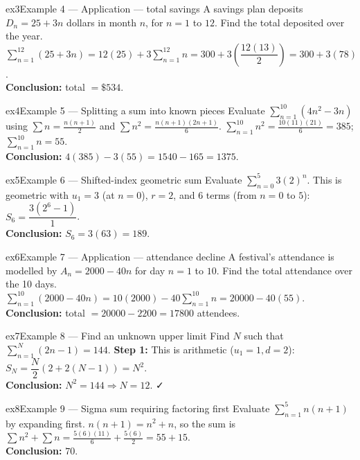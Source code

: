 \documentclass[11pt]{article}
\begin{document}
\begin{example}{ex3}{Example 4 --- Application --- total savings}
A savings plan deposits $D_n=25+3n$ dollars in month $n$, for $n=1$ to $12$. Find the total deposited over the year.\soln
$\displaystyle\sum_{n=1}^{12}(25+3n)=12(25)+3\sum_{n=1}^{12}n=300+3\left(\dfrac{12(13)}{2}\right)=300+3(78)$.\\[3pt]\textbf{Conclusion:} total $=\$534$.
\end{example}

\begin{example}{ex4}{Example 5 --- Splitting a sum into known pieces}
Evaluate $\displaystyle\sum_{n=1}^{10}(4n^2-3n)$ using $\sum n=\tfrac{n(n+1)}2$ and $\sum n^2=\tfrac{n(n+1)(2n+1)}6$.\soln
$\sum_{n=1}^{10}n^2=\tfrac{10(11)(21)}6=385$; $\sum_{n=1}^{10}n=55$.\\[3pt]\textbf{Conclusion:} $4(385)-3(55)=1540-165=1375$.
\end{example}

\begin{example}{ex5}{Example 6 --- Shifted-index geometric sum}
Evaluate $\displaystyle\sum_{n=0}^{5}3(2)^{n}$.\soln
This is geometric with $u_1=3$ (at $n=0$), $r=2$, and $6$ terms (from $n=0$ to $5$): $S_6=\dfrac{3(2^6-1)}{1}$.\\[3pt]\textbf{Conclusion:} $S_6=3(63)=189$.
\end{example}

\begin{example}{ex6}{Example 7 --- Application --- attendance decline}
A festival's attendance is modelled by $A_n=2000-40n$ for day $n=1$ to $10$. Find the total attendance over the 10 days.\soln
$\displaystyle\sum_{n=1}^{10}(2000-40n)=10(2000)-40\sum_{n=1}^{10}n=20000-40(55)$.\\[3pt]\textbf{Conclusion:} total $=20000-2200=17800$ attendees.
\end{example}

\begin{example}{ex7}{Example 8 --- Find an unknown upper limit}
Find $N$ such that $\displaystyle\sum_{n=1}^{N}(2n-1)=144$.\soln
\textbf{Step 1:} This is arithmetic ($u_1=1,d=2$): $S_N=\dfrac N2(2+2(N-1))=N^2$.\\[3pt]
\textbf{Conclusion:} $N^2=144\Rightarrow N=12$. ✓
\end{example}

\begin{example}{ex8}{Example 9 --- Sigma sum requiring factoring first}
Evaluate $\displaystyle\sum_{n=1}^{5}n(n+1)$ by expanding first.\soln
$n(n+1)=n^2+n$, so the sum is $\sum n^2+\sum n=\tfrac{5(6)(11)}6+\tfrac{5(6)}2=55+15$.\\[3pt]\textbf{Conclusion:} $70$.
\end{example}
\end{document}
